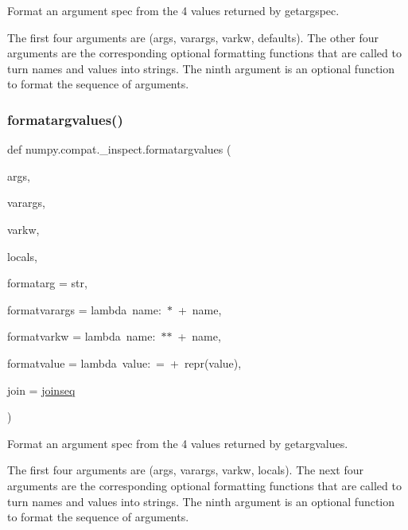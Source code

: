 \begin{DoxyVerb}Format an argument spec from the 4 values returned by getargspec.

The first four arguments are (args, varargs, varkw, defaults).  The
other four arguments are the corresponding optional formatting functions
that are called to turn names and values into strings.  The ninth
argument is an optional function to format the sequence of arguments.\end{DoxyVerb}
 \mbox{\label{namespacenumpy_1_1compat_1_1__inspect_af63fc3a833eff7c78a4b80b071c5cd2b}} 
\subsubsection{\texorpdfstring{formatargvalues()}{formatargvalues()}}
{\footnotesize\ttfamily def numpy.\+compat.\+\_\+inspect.\+formatargvalues (\begin{DoxyParamCaption}\item[{}]{args,  }\item[{}]{varargs,  }\item[{}]{varkw,  }\item[{}]{locals,  }\item[{}]{formatarg = {\ttfamily str},  }\item[{}]{formatvarargs = {\ttfamily lambda~name\+:~\textquotesingle{}$\ast$\textquotesingle{}~+~name},  }\item[{}]{formatvarkw = {\ttfamily lambda~name\+:~\textquotesingle{}$\ast$$\ast$\textquotesingle{}~+~name},  }\item[{}]{formatvalue = {\ttfamily lambda~value\+:~\textquotesingle{}=\textquotesingle{}~+~repr(value)},  }\item[{}]{join = {\ttfamily \hyperlink{namespacenumpy_1_1compat_1_1__inspect_ab1438af7fbbffb0fd2b5a564cdd7eef8}{joinseq}} }\end{DoxyParamCaption})}

\begin{DoxyVerb}Format an argument spec from the 4 values returned by getargvalues.

The first four arguments are (args, varargs, varkw, locals).  The
next four arguments are the corresponding optional formatting functions
that are called to turn names and values into strings.  The ninth
argument is an optional function to format the sequence of arguments.\end{DoxyVerb}
 \mbox{\label{namespacenumpy_1_1compat_1_1__inspect_a23817c2f9b36917251659f54ae73dd93}} 
